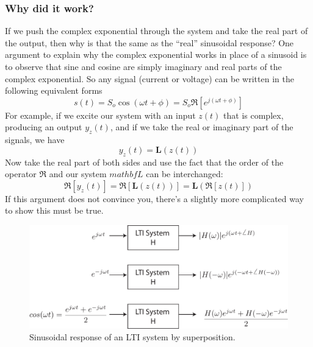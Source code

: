 \subsubsection{Why did it work?}
If we push the complex exponential through the system and take the real part of the output, then why is that the same as the ``real'' sinusoidal response?  One argument to explain why the complex exponential works in place of a sinusoid is to observe that sine and cosine are simply imaginary and real parts of the complex exponential.  So any signal (current or voltage) can be written in the following equivalent forms
    \begin{equation}
        s(t) = S_o \cos(\omega t + \phi) = S_o \Re[e^{j(\omega t + \phi)}]
    \end{equation}
For example, if we excite our system with an input $z(t)$ that is complex, producing an output $y_z(t)$, and if we take the real or imaginary part of the signals, we have
    \begin{equation}
        y_z(t) = \mathbf{L}(z(t))
    \end{equation}
Now take the real part of both sides and use the fact that the order of the operator $\Re$ and our system $mathbf{L}$ can be interchanged:
    \begin{equation}
        \Re[y_z(t)] = \Re[\mathbf{L}(z(t))]  = \mathbf{L} (\Re[z(t)])
    \end{equation}
If this argument does not convince you, there's a slightly more complicated way to show this must be true.
\begin{figure}[tb]
\centering
\includegraphics[width=.75\columnwidth]{lti_cosine}
\caption{Sinusoidal response of an LTI system by superposition. }
\label{fig:lti_cosine}
\end{figure}

